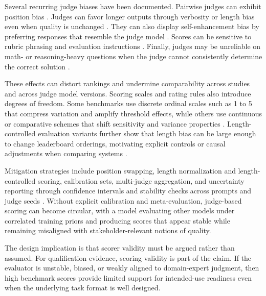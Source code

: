 Several recurring judge biases have been documented. Pairwise judges can exhibit position bias \cite{zheng_JudgingLLMasaJudgeMTBench_2023}. Judges can favor longer outputs through verbosity or length bias even when quality is unchanged \cite{zheng_JudgingLLMasaJudgeMTBench_2023, dubois_Length_Controlled_Alpaca_Eval_Simple_2025}. They can also display self-enhancement bias by preferring responses that resemble the judge model \cite{zheng_JudgingLLMasaJudgeMTBench_2023}. Scores can be sensitive to rubric phrasing and evaluation instructions \cite{zhouMitigatingBiasLarge2024}. Finally, judges may be unreliable on math- or reasoning-heavy questions when the judge cannot consistently determine the correct solution \cite{zheng_JudgingLLMasaJudgeMTBench_2023}.

These effects can distort rankings and undermine comparability across studies and across judge model versions. Scoring scales and rating rules also introduce degrees of freedom. Some benchmarks use discrete ordinal scales such as 1 to 5 that compress variation and amplify threshold effects, while others use continuous or comparative schemes that shift sensitivity and variance properties \cite{li_WhenLLMsMeetCunning_2024, zheng_JudgingLLMasaJudgeMTBench_2023}. Length-controlled evaluation variants further show that length bias can be large enough to change leaderboard orderings, motivating explicit controls or causal adjustments when comparing systems \cite{dubois_Length_Controlled_Alpaca_Eval_Simple_2025}.

Mitigation strategies include position swapping, length normalization and length-controlled scoring, calibration sets, multi-judge aggregation, and uncertainty reporting through confidence intervals and stability checks across prompts and judge seeds \cite{Tianle_Li_2024_BenchBuilder_ArenaHard_LLM_Benchmarking, zhouMitigatingBiasLarge2024}. Without explicit calibration and meta-evaluation, judge-based scoring can become circular, with a model evaluating other models under correlated training priors and producing scores that appear stable while remaining misaligned with stakeholder-relevant notions of quality.

The design implication is that scorer validity must be argued rather than assumed. For qualification evidence, scoring validity is part of the claim. If the evaluator is unstable, biased, or weakly aligned to domain-expert judgment, then high benchmark scores provide limited support for intended-use readiness even when the underlying task format is well designed.



